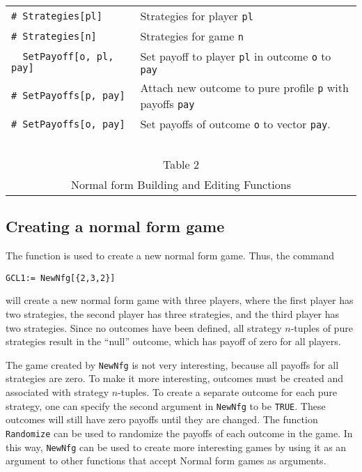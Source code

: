\begin{table}[htp]
\begin{center}
\begin{tabular} {|l||l|}
\verb+# Strategies[pl]+ &Strategies for player \verb+pl+\\ 
\verb+# Strategies[n]+ &Strategies for game \verb+n+ \\ 

\verb+  SetPayoff[o, pl, pay]+ &Set payoff to player \verb+pl+ in outcome \verb+o+ to \verb+pay+\\ 

\verb+# SetPayoffs[p, pay]+ &Attach new outcome to pure profile \verb+p+ with payoffs \verb+pay+\\ 
\verb+# SetPayoffs[o, pay]+ &Set payoffs of outcome \verb+o+ to vector \verb+pay+.  \\ 
\hline
\multicolumn{2}{c}{\ }\\
\multicolumn{2}{c}{Table 2}\\
\multicolumn{2}{c}{Normal form Building and Editing Functions}\\
\end{tabular}
\end{center}
\end{table}
\medskip


\subsection{Creating a normal form game}

The function  is used to create a new normal form game.
Thus, the command

\begin{verbatim}
GCL1:= NewNfg[{2,3,2}]
\end{verbatim}

\noindent 
will create a new normal form game with three players, where the first
player has two strategies, the second player has three strategies, and
the third player has two strategies.  Since no outcomes have been
defined, all strategy $n$-tuples of pure strategies result in the
``null'' outcome, which has payoff of zero for all players.  

The game created by \verb+NewNfg+ is not very interesting, because all
payoffs for all strategies are zero.  To make it more interesting,
outcomes must be created and associated with strategy $n$-tuples.  To
create a separate outcome for each pure strategy, one can specify the
second argument in \verb+NewNfg+ to be \verb+TRUE+.  These outcomes
will still have zero payoffs until they are changed. The function
\verb+Randomize+ can be used to randomize the payoffs of each outcome
in the game.  In this way, \verb+NewNfg+ can be used to create
more interesting games by using it as an argument to other functions
that accept Normal form games as arguments.

